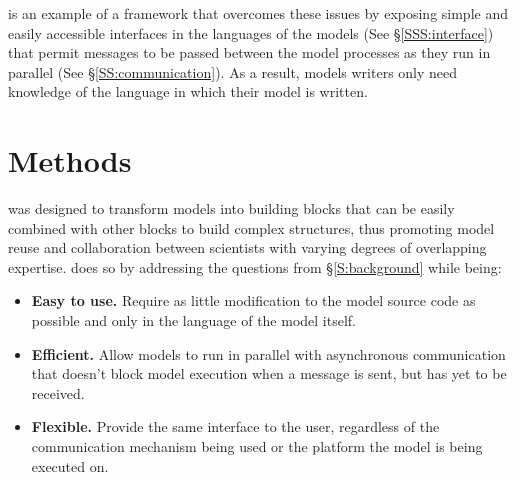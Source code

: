 \documentclass[journal]{IEEEtran}
\newcommand{\todo}[1]{{\color{red}{#1}}}
\newcommand{\pkg}{{\tt \todo{cis\_interface}}{}}
\begin{document}
{\pkg} is an example of a framework that overcomes these issues by exposing simple and easily accessible interfaces in the languages of the models (See \S\ref{SSS:interface}) that permit messages to be passed between the model processes as they run in parallel (See \S\ref{SS:communication}). As a result, models writers only need knowledge of the language in which their model is written.

%

\section{Methods}\label{S:methods}

{\pkg} was designed to transform models into building blocks that can be easily combined with other blocks to build complex structures, thus promoting model reuse and collaboration between scientists with varying degrees of overlapping expertise. {\pkg} does so by addressing the questions from \S\ref{S:background} while being:

\begin{itemize}
	\item {\bf Easy to use.} Require as little modification to the model source code as possible and only in the language of the model itself.
	\item {\bf Efficient.} Allow models to run in parallel with asynchronous communication that doesn't block model execution when a message is sent, but has yet to be received.
	\item {\bf Flexible.} Provide the same interface to the user, regardless of the communication mechanism being used or the platform the model is being executed on.
\end{itemize}
\end{document}
